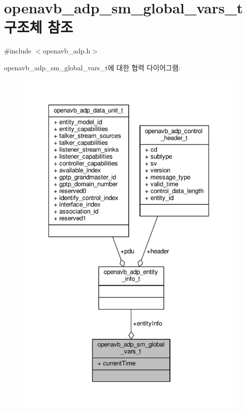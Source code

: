\hypertarget{structopenavb__adp__sm__global__vars__t}{}\section{openavb\+\_\+adp\+\_\+sm\+\_\+global\+\_\+vars\+\_\+t 구조체 참조}
\label{structopenavb__adp__sm__global__vars__t}


{\ttfamily \#include $<$openavb\+\_\+adp.\+h$>$}



openavb\+\_\+adp\+\_\+sm\+\_\+global\+\_\+vars\+\_\+t에 대한 협력 다이어그램\+:
\nopagebreak
\begin{figure}[H]
\begin{center}
\leavevmode
\includegraphics[width=336pt]{structopenavb__adp__sm__global__vars__t__coll__graph}
\end{center}
\end{figure}
